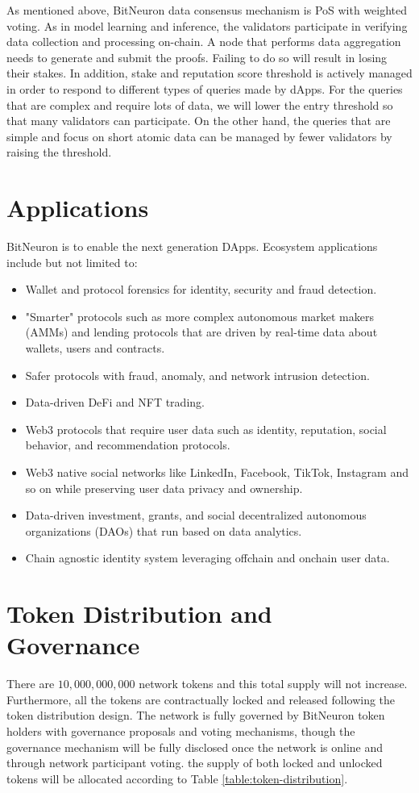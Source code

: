 \documentclass[11pt,letterpaper]{article}
\begin{document}
As mentioned above, BitNeuron data consensus mechanism is PoS with weighted voting. As in model learning and inference, the validators participate in verifying data collection and processing on-chain. A node that performs data aggregation needs to generate and submit the proofs. Failing to do so will result in losing their stakes. In addition, stake and reputation score threshold is actively managed in order to respond to different types of queries made by dApps. For the queries that are complex and require lots of data, we will lower the entry threshold so that many validators can participate. On the other hand, the queries that are simple and focus on short atomic data can be managed by fewer validators by raising the threshold.

\section{Applications}
BitNeuron is to enable the next generation DApps. Ecosystem applications include but not limited to:
\begin{itemize}
    \item Wallet and protocol forensics for identity, security and fraud detection.
    \item "Smarter" protocols such as more complex autonomous market makers (AMMs) and lending protocols that are driven by real-time data about wallets, users and contracts.
    \item Safer protocols with fraud, anomaly, and network intrusion detection.
    \item Data-driven DeFi and NFT trading.
    \item Web3 protocols that require user data such as identity, reputation, social behavior, and recommendation protocols.
    \item Web3 native social networks like LinkedIn, Facebook, TikTok, Instagram and so on while preserving user data privacy and ownership.
    \item Data-driven investment, grants, and social decentralized autonomous organizations (DAOs) that run based on data analytics.
    \item Chain agnostic identity system leveraging offchain and onchain user data.
\end{itemize}

\section{Token Distribution and Governance}
There are $10,000,000,000$ network tokens and this total supply will not increase. Furthermore, all the tokens are contractually locked and released following the token
distribution design. The network is fully governed by BitNeuron token holders with governance proposals and voting mechanisms, though the governance mechanism will be fully disclosed once the network is online and through network participant voting. the supply of both locked and unlocked tokens will be allocated according to Table \ref{table:token-distribution}.
\end{document}
